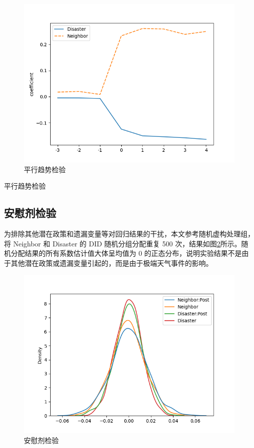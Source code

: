 \begin{figure}[H]
    \includegraphics[width=\linewidth]{lib/img/robust.png}
    \caption{平行趋势检验}\label{fig:robust}
\end{figure}
\begin{table}[H]
    \centering
    \renewcommand{\arraystretch}{0.8}
    \caption{平行趋势检验}\label{tab:robust}
    
\end{table}

\subsection{安慰剂检验}
为排除其他潜在政策和遗漏变量等对回归结果的干扰，本文参考\citet{CYJJ202104009}随机虚构处理组，将 Neighbor 和 Disaster 的 DID 随机分组分配重复 500 次，结果如图\ref{fig:randomtest}所示。随机分配结果的所有系数估计值大体呈均值为 0 的正态分布，说明实验结果不是由于其他潜在政策或遗漏变量引起的，而是由于极端天气事件的影响。
\begin{figure}[H]
    \includegraphics[width=\linewidth]{lib/img/randomtest.png}
    \caption{安慰剂检验}\label{fig:randomtest}
\end{figure}

